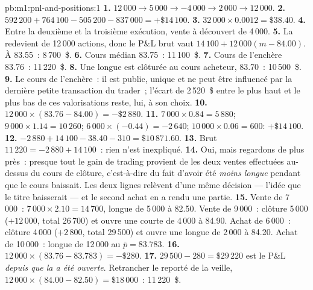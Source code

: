 \begin{solution}{pb:m1:pnl-and-positions:1}
\textbf{1.} $12\,000 \to 5\,000 \to -4\,000 \to 2\,000 \to 12\,000$.
\textbf{2.} $592\,200 + 764\,100 - 505\,200 - 837\,000 = +\$14\,100$.
\textbf{3.} $32\,000 \times 0.0012 = \$38.40$.
\textbf{4.} Entre la deuxième et la troisième exécution, vente à découvert de 4\,000.
\textbf{5.} La  redevient de 12\,000 actions, donc le P\&L brut vaut
$14\,100 + 12\,000(m - 84.00)$. À 83.55~: 8\,700~\$.
\textbf{6.} Cours médian 83.75~: 11\,100~\$.
\textbf{7.} Cours de l'enchère 83.76~: 11\,220~\$.
\textbf{8.} Une  longue est clôturée au cours acheteur, 83.70~: 10\,500~\$.
\textbf{9.} Le cours de l'enchère~: il est public, unique et ne peut être influencé
par la dernière petite transaction du trader~; l'écart de 2\,520~\$ entre le plus haut et
le plus bas de ces valorisations reste, lui, à son choix.
\textbf{10.} $12\,000\times(83.76-84.00) = -\$2\,880$.
\textbf{11.} $7\,000\times0.84 = 5\,880$; $9\,000\times1.14 = 10\,260$;
$6\,000\times(-0.44) = -2\,640$; $10\,000\times0.06 = 600$: $+\$14\,100$.
\textbf{12.} $-2\,880 + 14\,100 - 38.40 - 310 = \$10\,871.60$.
\textbf{13.} Brut $11\,220 = -2\,880 + 14\,100$~: rien n'est inexpliqué.
\textbf{14.} Oui, mais regardons de plus près~: presque tout le gain de trading provient de
les deux ventes effectuées au-dessus du cours de clôture, c'est-à-dire du fait d'avoir été \emph{moins
longue} pendant que le cours baissait. Les deux lignes relèvent d'une même décision --- l'idée que le
titre baisserait --- et le second achat en a rendu une partie.
\textbf{15.} Vente de 7\,000~:  $7\,000\times2.10 = 14\,700$,  longue de 5\,000 à
82.50. Vente de 9\,000~: clôture 5\,000 ($+12\,000$, total 26\,700) et ouvre une  courte
de 4\,000 à 84.90. Achat de 6\,000~: clôture 4\,000 ($+2\,800$, total 29\,500) et ouvre
une  longue de 2\,000 à 84.20. Achat de 10\,000~:  longue de 12\,000 au $\bar p = 83.783$.
\textbf{16.} $12\,000\times(83.76-83.783) = -\$280$.
\textbf{17.} $29\,500 - 280 = \$29\,220$ est le P\&L \emph{depuis que la 
a été ouverte}. Retrancher le  reporté de la veille,
$12\,000\times(84.00-82.50) = \$18\,000$~: 11\,220~\$.

\end{solution}
